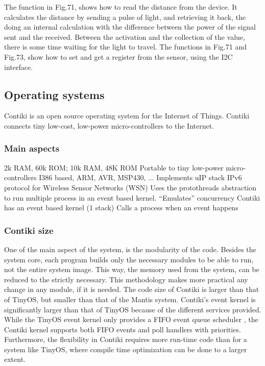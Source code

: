 The function in Fig.71,
	shows how to read the distance from the device.
It calculates the distance by sending a pulse of light,
	and retrieving it back,
	the doing an internal calculation with the difference between the power of the signal sent and the received.
Between the activation and the collection of the value,
	there is some time waiting for the light to travel.
The functions in Fig.71 and Fig.73,
	show how to set and get a register from the sensor,
	using the I2C interface.




\subsection{Operating systems}

Contiki is an open source operating system for the Internet of Things.
Contiki connects tiny low-cost,
	low-power micro-controllers to the Internet.

\subsubsection{Main aspects}
2k RAM, 60k ROM; 10k RAM, 48K ROM
Portable to tiny low-power micro-controllers
I386 based, ARM, AVR, MSP430, ...
Implements uIP stack
IPv6 protocol for Wireless Sensor Networks (WSN)
Uses the protothreads abstraction to run multiple process in an event based
kernel.
“Emulates” concurrency
Contiki has an event based kernel (1 stack)
Calls a process when an event happens

\subsubsection{Contiki size}
One of the main aspect of the system,
	is the modularity of the code.
Besides the system core,
	each program builds only the necessary modules to be able to run,
	not the entire system image.
This way,
	the memory used from the system,
	can be reduced to the strictly necessary.
This methodology makes more practical any change in any module,
	if it is needed.
The code size of Contiki is larger than that of TinyOS,
	but smaller than that of the Mantis system.
Contiki's event kernel is significantly larger than that of TinyOS because of the different services provided.
While the TinyOS event kernel only provides a FIFO event queue scheduler ,
	the Contiki kernel supports both FIFO events and poll handlers with priorities.
Furthermore,
	the flexibility in Contiki requires more run-time code than for a system like TinyOS,
	where compile time optimization can be done to a larger extent.


